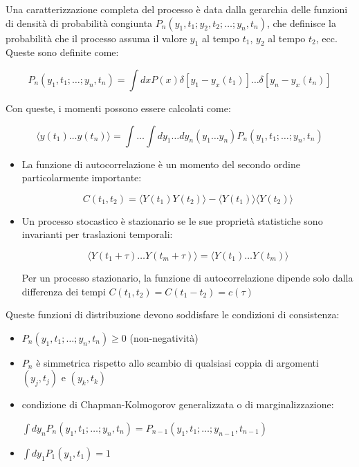 Una caratterizzazione completa del processo è data dalla gerarchia delle funzioni di densità di probabilità congiunta $P_n(y_1,t_1; y_2,t_2; \dots; y_n,t_n)$, che definisce la probabilità che il processo assuma il valore $y_1$ al tempo $t_1$, $y_2$ al tempo $t_2$, ecc. Queste sono definite come:


\begin{equation}
P_n(y_1,t_1; \dots; y_n,t_n) = \int dx P(x) \delta[y_1-y_x(t_1)] \dots \delta[y_n-y_x(t_n)]
\end{equation}


Con queste, i momenti possono essere calcolati come:


\begin{equation}
\langle y(t_1)\dots y(t_n) \rangle = \int \dots \int dy_1 \dots dy_n (y_1 \dots y_n) P_n(y_1,t_1; \dots; y_n,t_n)
\end{equation}

\begin{itemize}
    \item La funzione di autocorrelazione è un momento del secondo ordine particolarmente importante:

\begin{equation}
C(t_1, t_2) = \langle Y(t_1)Y(t_2) \rangle - \langle Y(t_1) \rangle \langle Y(t_2) \rangle
\end{equation}


\item Un processo stocastico è stazionario se le sue proprietà statistiche sono invarianti per traslazioni temporali:
    

    \begin{equation}
    \langle Y(t_1+\tau) \dots Y(t_m+\tau) \rangle = \langle Y(t_1) \dots Y(t_m) \rangle
    \end{equation}

    
    Per un processo stazionario, la funzione di autocorrelazione dipende solo dalla differenza dei tempi $C(t_1, t_2) = C(t_1-t_2) = c(\tau)$
    
\end{itemize}

Queste funzioni di distribuzione devono soddisfare le condizioni di consistenza:

\begin{itemize}
    \item $P_n(y_1,t_1; \dots; y_n,t_n) \ge 0$ (non-negatività)
\item $P_n$ è simmetrica rispetto allo scambio di qualsiasi coppia di argomenti $(y_j,t_j)$ e $(y_k,t_k)$
\item condizione di Chapman-Kolmogorov generalizzata o di marginalizzazione:
    
    $\int dy_n P_n(y_1,t_1; \dots; y_n,t_n) = P_{n-1}(y_1,t_1; \dots; y_{n-1},t_{n-1})$ 
    
\item  $\int dy_1 P_1(y_1,t_1) = 1$
\end{itemize}

